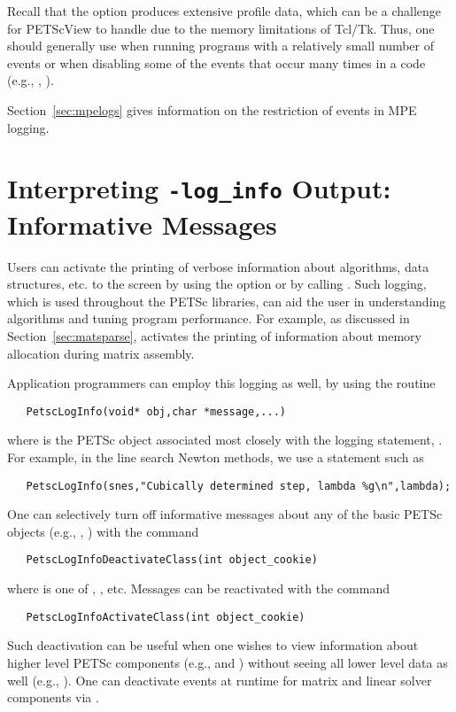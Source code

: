 Recall that the option  produces extensive profile
data, which can be a challenge for PETScView to handle due to
the memory limitations of Tcl/Tk.  Thus, one should generally use
 when running programs with a relatively small
number of events or when disabling some of the events that occur many
times in a code (e.g., , ).

Section~\ref{sec:mpelogs} gives information on the restriction of events
in MPE logging.


\section{Interpreting {\tt -log\_info} Output: Informative Messages}
\label{sec:PetscLoginfo}

Users can activate the printing of verbose information about
algorithms, data structures, etc. to the screen by using the option   or by calling . 
Such logging, which is used throughout the PETSc libraries,
can aid the user in understanding algorithms and 
tuning program performance.  For example, as discussed in
Section~\ref{sec:matsparse},  activates the
printing of information about memory allocation during
matrix assembly.

Application programmers can employ this logging as well, by
using the routine 
\begin{verbatim}
   PetscLogInfo(void* obj,char *message,...)
\end{verbatim}
where  is the PETSc object associated most closely with
the logging statement, .
For example, in the line search Newton methods, we use a statement such as
\begin{verbatim}
   PetscLogInfo(snes,"Cubically determined step, lambda %g\n",lambda);
\end{verbatim}

One can selectively turn off informative messages about any of the 
basic PETSc objects (e.g., , ) with the command
\begin{verbatim}
   PetscLogInfoDeactivateClass(int object_cookie)
\end{verbatim}
where  
 is one of , , etc.
Messages can be reactivated with the command
\begin{verbatim}
   PetscLogInfoActivateClass(int object_cookie)
\end{verbatim}
Such deactivation can be useful when one wishes to view information
about higher level PETSc components (e.g.,  and ) without 
seeing all lower level data as well (e.g., ).  One can deactivate
events at runtime for matrix and linear solver components via .

